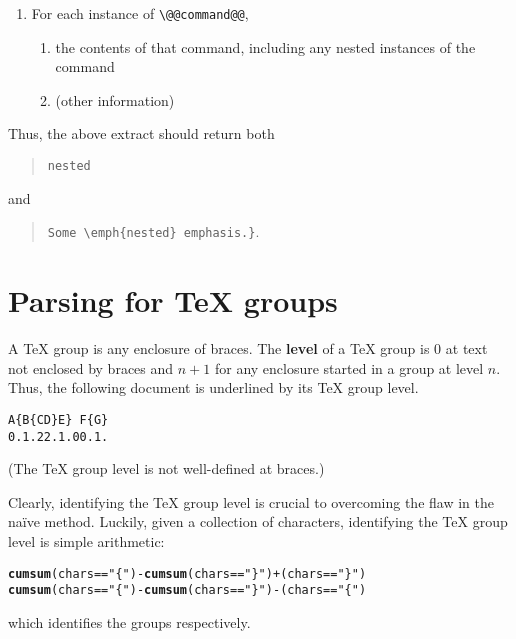 \documentclass[b5paper]{scrartcl}\usepackage[]{graphicx}\usepackage[]{color}
\makeatletter
\newcommand{\hlstr}[1]{\textcolor[rgb]{0.192,0.494,0.8}{#1}}%
\newcommand{\hlopt}[1]{\textcolor[rgb]{0,0,0}{#1}}%
\newcommand{\hlstd}[1]{\textcolor[rgb]{0.345,0.345,0.345}{#1}}%
\newcommand{\hlkwd}[1]{\textcolor[rgb]{0.737,0.353,0.396}{\textbf{#1}}}%
\newenvironment{kframe}{%
 \def\at@end@of@kframe{}%
 \ifinner\ifhmode%
  \def\at@end@of@kframe{\end{minipage}}%
  \begin{minipage}{\columnwidth}%
 \fi\fi%
 \def\FrameCommand##1{\hskip\@totalleftmargin \hskip-\fboxsep
 \colorbox{shadecolor}{##1}\hskip-\fboxsep
     \hskip-\linewidth \hskip-\@totalleftmargin \hskip\columnwidth}%
 \MakeFramed {\advance\hsize-\width
   \@totalleftmargin\z@ \linewidth\hsize
   \@setminipage}}%
 {\par\unskip\endMakeFramed%
 \at@end@of@kframe}
\newenvironment{knitrout}{}{} %
\newcommand*{\defi}[1]{\textbf{#1}}
\makeatother
\begin{document}
\begin{enumerate}
	\item[] For each instance of \lstinline!\@@command@@!, 
	\begin{enumerate}
		\item the contents of that command, including any nested instances of the command
		\item (other information)
	\end{enumerate}
\end{enumerate}

Thus, the above extract should return both 
\begin{quote}\lstinline!nested!\end{quote} and \begin{quote}\lstinline!Some \emph{nested} emphasis.}!.\end{quote}

\section{Parsing for \TeX{} groups}
A \TeX{} group is any enclosure of braces. 
The \defi{level} of a \TeX{} group is 0 at text not enclosed by braces and \(n+1\) for any enclosure started in a group at level \(n\).
Thus, the following document is underlined by its \TeX{} group level.

\begin{lstlisting}
A{B{CD}E} F{G}
0.1.22.1.00.1.
\end{lstlisting}
(The \TeX{} group level is not well-defined at braces.)

Clearly, identifying the \TeX{} group level is crucial to overcoming the flaw in the na\"ive method. 
Luckily, given a collection of characters, identifying the \TeX{} group level is simple arithmetic:
\begin{knitrout}\small
{}\color{fgcolor}\begin{kframe}
\begin{alltt}
\hlkwd{cumsum}\hlstd{(chars} \hlopt{==} \hlstr{"\{"}\hlstd{)} \hlopt{-} \hlkwd{cumsum}\hlstd{(chars} \hlopt{==} \hlstr{"\}"}\hlstd{)} \hlopt{+} \hlstd{(chars} \hlopt{==} \hlstr{"\}"}\hlstd{)}
\hlkwd{cumsum}\hlstd{(chars} \hlopt{==} \hlstr{"\{"}\hlstd{)} \hlopt{-} \hlkwd{cumsum}\hlstd{(chars} \hlopt{==} \hlstr{"\}"}\hlstd{)} \hlopt{-} \hlstd{(chars} \hlopt{==} \hlstr{"\{"}\hlstd{)}
\end{alltt}
\end{kframe}
\end{knitrout}
which identifies the groups respectively. 
\end{document}
